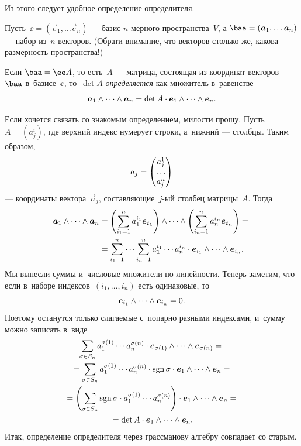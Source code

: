 Из этого следует удобное определение определителя.
\begin{definition}
	Пусть~$\ee = (\vec{e}_1, \dots \vec{e}_n)$ --- базис $n$-мерного пространства~$V$, а $\baa = (\vec{a}_1, \dots \vec{a}_n)$ --- набор из~$n$ векторов. (Обрати внимание, что векторов столько же, какова размерность пространства!)
	
	Если $\baa = \ee A$, то есть~$A$ --- матрица, состоящая из координат векторов~$\baa$ в~базисе~$\ee$, то~$\det{A}$ \emph{определяется} как множитель в~равенстве
	\[
		\bm{a}_1 \wedge\cdots\wedge \bm{a}_n
		=
		\det{A}
		\cdot
		\bm{e}_1 \wedge\cdots\wedge \bm{e}_n
		.
	\]
\end{definition}

\sloppy
Если хочется связать со знакомым определением, милости прошу. Пусть~$A = (a^i_j)$, где верхний индекс нумерует строки, а~нижний --- столбцы. Таким образом,
\[
	a_j =
	\begin{pmatrix}a_j^1 \\ \dots \\ a_j^n\end{pmatrix}
\]
--- координаты вектора~$\vec{a}_j$, составляющие~$j$-ый столбец матрицы~$A$. Тогда
\begin{align*}
	\bm{a}_1 \wedge\cdots\wedge \bm{a}_n
	&=
	\left( 
		\sum_{i_1 = 1}^{n}
			a_1^{i_1}
			\bm{e_{i_1}}
	\right)
	\wedge\cdots\wedge
	\left( 
		\sum_{i_n = 1}^{n}
			a_n^{i_n}
			\bm{e_{i_n}}
	\right)
	= {} \\ {} &=
	\sum_{i_1 = 1}^{n}
	\cdots
	\sum_{i_n = 1}^{n}
		a_1^{i_1}
		\cdots
		a_n^{i_n}
		\cdot
		\bm{e}_{i_1}
		\wedge\cdots\wedge
		\bm{e}_{i_n}
	.
\end{align*}
Мы вынесли суммы и~числовые множители по линейности. Теперь заметим, что если в~наборе индексов~$(i_1, \dots, i_n)$ есть одинаковые, то
\[
	\bm{e}_{i_1} \wedge\cdots\wedge \bm{e}_{i_n} = 0
	.
\]
Поэтому останутся только слагаемые с~попарно разными индексами, и~сумму можно записать в~виде
\begin{multline*}
	\sum_{\sigma \in S_n}
	a_1^{\sigma(1)}
	\cdots
	a_n^{\sigma(n)}
	\cdot
	\bm{e}_{\sigma(1)}
	\wedge\cdots\wedge
	\bm{e}_{\sigma(n)}
	= {} \\ {} =
	\sum_{\sigma \in S_n}
	a_1^{\sigma(1)}
	\cdots
	a_n^{\sigma(n)}
	\cdot
	\mathop{\mathrm{sgn}}{\sigma}
	\cdot
	\bm{e}_{1}
	\wedge\cdots\wedge
	\bm{e}_{n}
	= {} \\ {} =
	\left(
		\sum_{\sigma \in S_n}
			\mathop{\mathrm{sgn}}{\sigma}
			\cdot
			a_1^{\sigma(1)}
			\cdots
			a_n^{\sigma(n)}
	\right)
	\cdot
	\bm{e}_{1}
	\wedge\cdots\wedge
	\bm{e}_{n}
	= {} \\ {} =
	\det{A}
	\cdot
	\bm{e}_{1}
	\wedge\cdots\wedge
	\bm{e}_{n}
	.
\end{multline*}
Итак, определение определителя через грассманову алгебру совпадает со старым.

